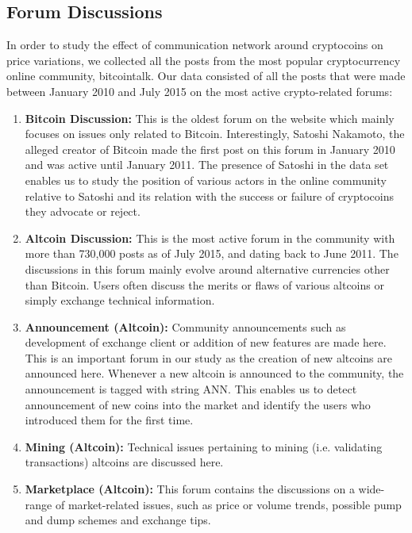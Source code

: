 

\subsection{Forum Discussions}

In order to study the effect of communication network around cryptocoins on
price variations, we collected all the posts from the most popular cryptocurrency
online community, bitcointalk.  Our data consisted of all the posts that were
made between January 2010 and July 2015 on the most active crypto-related forums:
\begin{enumerate}[topsep=0pt,itemsep=-0.5ex,partopsep=1ex,parsep=1ex]
  \item \textbf{Bitcoin Discussion:} This is the oldest forum on the website which mainly focuses
    on issues only related to Bitcoin. Interestingly, Satoshi Nakamoto, the alleged
    creator of Bitcoin made the first post on this forum in January 2010 and
    was active until January 2011. The presence of Satoshi in the data set enables us
    to study the position of various actors in the online community relative to Satoshi
    and its relation with the success or failure of cryptocoins they advocate or reject.
  \item \textbf{Altcoin Discussion:} This is the most active forum in the community
    with more than 730,000 posts as of July 2015, and dating back to June 2011.
    The discussions in this forum mainly evolve around alternative currencies
    other than Bitcoin. Users often discuss the merits or flaws of various
    altcoins or simply exchange technical information.
  \item \textbf{Announcement (Altcoin):} Community announcements such as development of 
    exchange client or addition of new features are made here. This is an important forum
    in our study as the creation of new altcoins are announced here. Whenever a new
    altcoin is announced to the community, the announcement is tagged with string ANN.
    This enables us to detect announcement of new coins into the market and identify
    the users who introduced them for the first time.
  \item \textbf{Mining (Altcoin):} Technical issues pertaining to mining (i.e. validating transactions)
    altcoins are discussed here.
  \item \textbf{Marketplace (Altcoin):} This forum contains the discussions on a wide-range of 
    market-related issues, such as price or volume trends, possible pump and dump schemes
    and exchange tips.
\end{enumerate}

